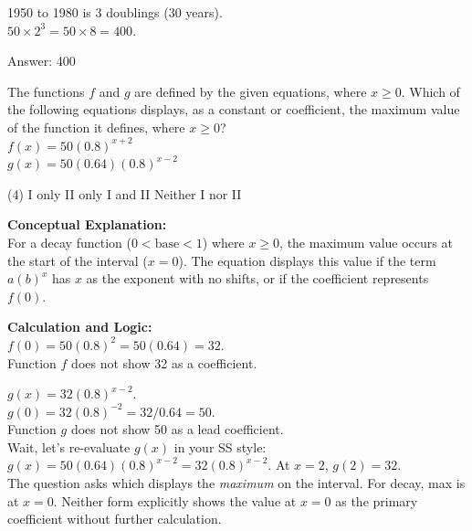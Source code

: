 \documentclass[11pt,paper=a4,answers]{exam}
\begin{document}
\begin{questions}
\begin{solution}
\vspace{10pt}

1950 to 1980 is 3 doublings (30 years). \\
$50 \times 2^3 = 50 \times 8 = 400$.

\vspace{25pt}

Answer: \colorbox{yellow!100}{400}
\end{solution}

\vspace{40pt}

\question
The functions $f$ and $g$ are defined by the given equations, where $x \geq 0$. Which of the following equations displays, as a constant or coefficient, the maximum value of the function it defines, where $x \geq 0$? \\
$f(x) = 50(0.8)^{x+2}$ \\
$g(x) = 50(0.64)(0.8)^{x-2}$
\begin{tasks}(4)
    \task I only
    \task II only
    \task I and II
    \task Neither I nor II
\end{tasks}

\begin{solution}
\textbf{Conceptual Explanation:} \\
For a decay function ($0 < \text{base} < 1$) where $x \geq 0$, the maximum value occurs at the start of the interval ($x=0$). The equation displays this value if the term $a(b)^x$ has $x$ as the exponent with no shifts, or if the coefficient represents $f(0)$.

\vspace{20pt}

\textbf{Calculation and Logic:} \\
$f(0) = 50(0.8)^2 = 50(0.64) = 32$. \\
Function $f$ does not show 32 as a coefficient.

\vspace{10pt}

$g(x) = 32(0.8)^{x-2}$. \\
$g(0) = 32(0.8)^{-2} = 32 / 0.64 = 50$. \\
Function $g$ does not show 50 as a lead coefficient. \\
Wait, let's re-evaluate $g(x)$ in your SS style: \\
$g(x) = 50(0.64)(0.8)^{x-2} = 32(0.8)^{x-2}$. At $x=2$, $g(2)=32$. \\
The question asks which displays the \textit{maximum} on the interval. For decay, max is at $x=0$. Neither form explicitly shows the value at $x=0$ as the primary coefficient without further calculation.


\end{solution}
\end{questions}
\end{document}

